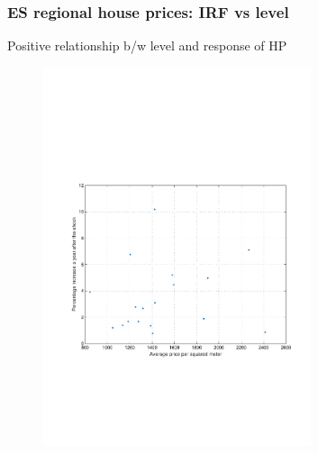 \documentclass[pdflatex,aspectratio=169]{beamer}
\begin{document}
\begin{frame}\frametitle{\bf ES regional house prices: IRF vs level \hyperlink{Robust}{} \hypertarget{ESlocalHPlevel}{}}
Positive relationship b/w level and response of HP
\begin{figure}
\begin{center}
\includegraphics[width=0.7\textwidth]{./figures/fHP_irf_level_scatter}\\
\end{center}
\end{figure}

\end{frame}
\end{document}
